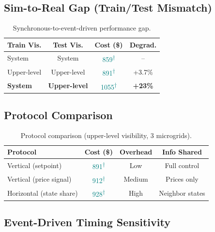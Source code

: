 \documentclass{article}
\newcommand{\exampleval}[1]{\textcolor{teal}{#1}\textsuperscript{\textcolor{teal}{$\dagger$}}}
\begin{document}
\subsection{Sim-to-Real Gap (Train/Test Mismatch)}

\begin{table}[h]
\centering
\caption{Synchronous-to-event-driven performance gap.}
\label{tab:mismatch}
\small
\begin{tabular}{@{}lccc@{}}
\toprule
\textbf{Train Vis.} & \textbf{Test Vis.} & \textbf{Cost (\$)} & \textbf{Degrad.} \\
\midrule
System & System & \exampleval{859} & -- \\
Upper-level & Upper-level & \exampleval{891} & +3.7\% \\
\midrule
\textbf{System} & \textbf{Upper-level} & \exampleval{1055} & \textbf{+23\%} \\
\bottomrule
\end{tabular}
\end{table}

\subsection{Protocol Comparison}

\begin{table}[h]
\centering
\caption{Protocol comparison (upper-level visibility, 3 microgrids).}
\label{tab:protocol}
\small
\begin{tabular}{@{}lccc@{}}
\toprule
\textbf{Protocol} & \textbf{Cost (\$)} & \textbf{Overhead} & \textbf{Info Shared} \\
\midrule
Vertical (setpoint) & \exampleval{891} & Low & Full control \\
Vertical (price signal) & \exampleval{912} & Medium & Prices only \\
Horizontal (state share) & \exampleval{928} & High & Neighbor states \\
\bottomrule
\end{tabular}
\end{table}

\subsection{Event-Driven Timing Sensitivity}
\end{document}
